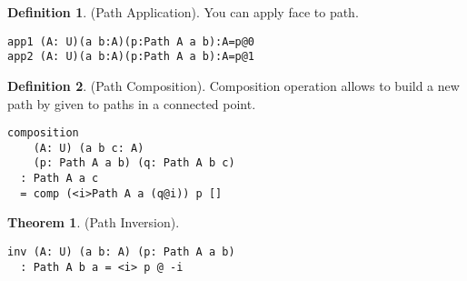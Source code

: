 \documentclass[twocolumn,10pt]{article}
\theoremstyle{definition}
\newtheorem{theorem}{Theorem}
\newtheorem{definition}{Definition}
\begin{document}
\begin{definition} (Path Application).
You can apply face to path.
\begin{lstlisting}
app1 (A: U)(a b:A)(p:Path A a b):A=p@0
app2 (A: U)(a b:A)(p:Path A a b):A=p@1
\end{lstlisting}
\end{definition}

\begin{definition} (Path Composition).
Composition operation allows to build a new path by given to paths
in a connected point.
\begin{center}
\end{center}
\begin{lstlisting}
composition
    (A: U) (a b c: A)
    (p: Path A a b) (q: Path A b c)
  : Path A a c
  = comp (<i>Path A a (q@i)) p []
\end{lstlisting}
\end{definition}

\begin{theorem} (Path Inversion).
\begin{lstlisting}
inv (A: U) (a b: A) (p: Path A a b)
  : Path A b a = <i> p @ -i
\end{lstlisting}
\end{theorem}
\end{document}
